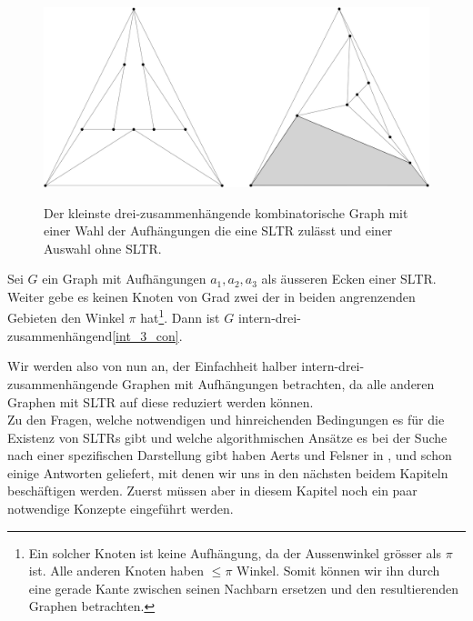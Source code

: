 \begin{figure}
	\centering
  \includegraphics[scale=0.1]{10_example.png}
  	\label{10_example}
	\caption{Der kleinste drei-zusammenhängende kombinatorische Graph mit einer Wahl der Aufhängungen die eine SLTR zulässt und einer Auswahl ohne SLTR.}
\end{figure}

\begin{proposition}
Sei $G$ ein Graph mit Aufhängungen $a_1,a_2,a_3$ als äusseren Ecken einer SLTR. Weiter gebe es keinen Knoten von Grad zwei der in beiden angrenzenden Gebieten den Winkel $\pi$ hat\footnote{Ein solcher Knoten ist keine Aufhängung, da der Aussenwinkel grösser als $\pi$ ist. Alle anderen Knoten haben $\leq\pi$ Winkel. Somit können wir ihn durch eine gerade Kante zwischen seinen Nachbarn ersetzen und den resultierenden Graphen betrachten.}. Dann ist $G$ intern-drei-zusammenhängend\ref{int_3_con}.
\end{proposition}


Wir werden also von nun an, der Einfachheit halber intern-drei-zusammenhängende Graphen mit Aufhängungen betrachten, da alle anderen Graphen mit SLTR auf diese reduziert werden können. \\

Zu den Fragen, welche notwendigen und hinreichenden Bedingungen es für die Existenz von SLTRs gibt und  welche algorithmischen Ansätze es bei der Suche nach einer spezifischen Darstellung gibt haben Aerts und Felsner in \cite{af13}, \cite{af13h} und \cite{af15} schon einige Antworten geliefert, mit denen wir uns in den nächsten beidem Kapiteln beschäftigen werden. Zuerst müssen aber in diesem Kapitel noch ein paar notwendige Konzepte eingeführt werden.
